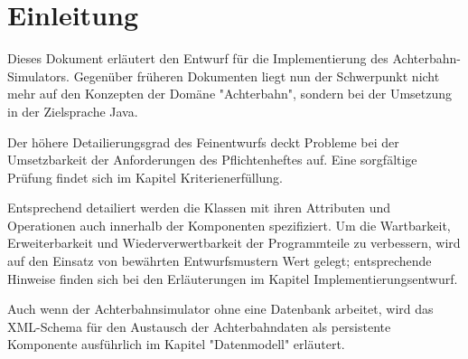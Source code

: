 
\chapter{Einleitung}

Dieses Dokument erläutert den Entwurf für die Implementierung des Achterbahn-Simulators.
Gegenüber früheren Dokumenten liegt nun der Schwerpunkt nicht mehr auf den Konzepten 
der Domäne "Achterbahn", sondern bei der Umsetzung in der Zielsprache Java. 

Der höhere Detailierungsgrad des Feinentwurfs deckt Probleme bei der Umsetzbarkeit
der Anforderungen des Pflichtenheftes auf. Eine sorgfältige Prüfung findet sich im 
Kapitel Kriterienerfüllung.

Entsprechend detailiert werden die Klassen mit ihren Attributen und Operationen auch innerhalb der
Komponenten spezifiziert. Um die Wartbarkeit, Erweiterbarkeit und Wiederverwertbarkeit
der Programmteile zu verbessern, wird auf den Einsatz von bewährten Entwurfsmustern
Wert gelegt; entsprechende Hinweise finden sich bei den Erläuterungen im Kapitel 
Implementierungsentwurf.

Auch wenn der Achterbahnsimulator ohne eine Datenbank arbeitet, wird das XML-Schema
für den Austausch der Achterbahndaten als persistente Komponente ausführlich 
im Kapitel "Datenmodell" erläutert.

